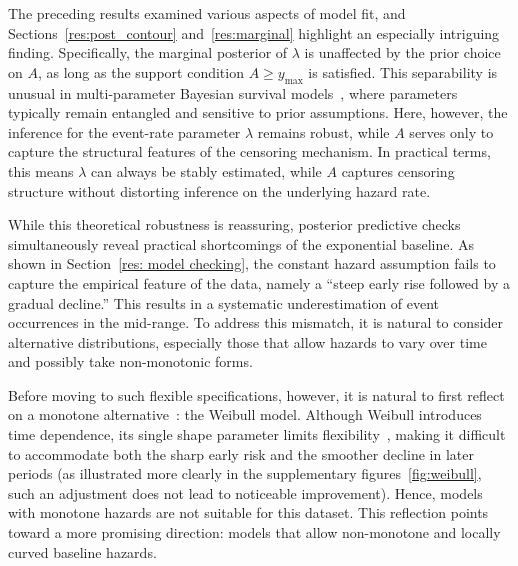 The preceding results examined various aspects of model fit, and Sections~\ref{res:post_contour} and~\ref{res:marginal} highlight an especially intriguing finding. Specifically, the marginal posterior of $\lambda$ is unaffected by the prior choice on $A$, as long as the support condition $A \geq y_{\max}$ is satisfied. This separability is unusual in multi-parameter Bayesian survival models~\cite{gelman1995bayesian, ohnishi2025principalstratificationrecurrentevents}, where parameters typically remain entangled and sensitive to prior assumptions. Here, however, the inference for the event-rate parameter $\lambda$ remains robust, while $A$ serves only to capture the structural features of the censoring mechanism. In practical terms, this means $\lambda$ can always be stably estimated, while $A$ captures censoring structure without distorting inference on the underlying hazard rate. 

While this theoretical robustness is reassuring, posterior predictive checks simultaneously reveal practical shortcomings of the exponential baseline. As shown in Section~\ref{res: model checking}, the constant hazard assumption fails to capture the empirical feature of the data, namely a “steep early rise followed by a gradual decline.” This results in a systematic underestimation of event occurrences in the mid-range. To address this mismatch, it is natural to consider alternative distributions, especially those that allow hazards to vary over time and possibly take non-monotonic forms.

Before moving to such flexible specifications, however, it is natural to first reflect on a monotone alternative~\cite{ibrahim2013bayesian}: the Weibull model. Although Weibull introduces time dependence, its single shape parameter limits flexibility~\cite{ibrahim2013bayesian, bartovs2022informed}, making it difficult to accommodate both the sharp early risk and the smoother decline in later periods (as illustrated more clearly in the supplementary figures~\ref{fig:weibull}, such an adjustment does not lead to noticeable improvement). Hence, models with monotone hazards are not suitable for this dataset. This reflection points toward a more promising direction: models that allow non-monotone and locally curved baseline hazards.

